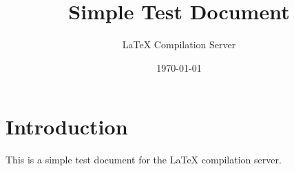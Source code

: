 \documentclass{article}
\title{Simple Test Document}
\author{LaTeX Compilation Server}
\date{\today}
\begin{document}
\maketitle

\section{Introduction}
This is a simple test document for the LaTeX compilation server.
\end{document}
